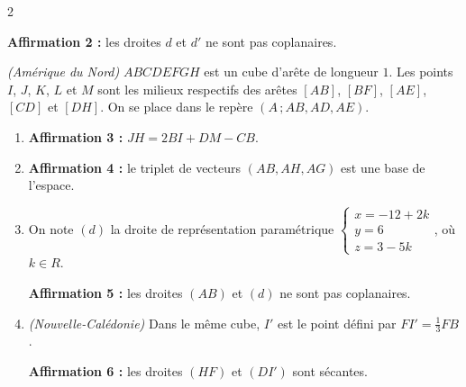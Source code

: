 \documentclass[a4paper,10pt]{article}
\newcommand{\R}{\mathbb{R}}
\newcommand{\N}{\mathbb{N}}
\newcommand{\Z}{\mathbb{Z}}
\newcommand{\Q}{\mathbb{Q}}
\newcommand{\vect}[1]{\overrightarrow{#1}}
\newcommand{\fois}[1]{\times{\color{coulExo}#1}}
\providecommand{\Cf}{\mathcal{C}\sb{f}}%
\providecommand{\Cg}{\mathcal{C}\sb{g}}%
\def\R{R}\def\N{N}\def\Z{Z}\def\Q{Q}\def\vect#1{#1}\def\Cf{Cf}\def\Cg{Cg}\def\fois#1{×#1}%
\newcommand{\paveespace}[3]{%
  \coordinate (A) at (0,0); \coordinate (B) at (#1,0);
  \coordinate (D) at ({0.45*#2},{0.35*#2}); \coordinate (C) at ({#1+0.45*#2},{0.35*#2});
  \coordinate (E) at (0,#3); \coordinate (F) at (#1,#3);
  \coordinate (H) at ({0.45*#2},{#3+0.35*#2}); \coordinate (G) at ({#1+0.45*#2},{#3+0.35*#2});
  \draw (A)--(B)--(F)--(E)--cycle (B)--(C)--(G)--(F) (E)--(H)--(G);
  \draw[dashed] (A)--(D)--(C) (D)--(H);
  \path[font=\footnotesize] (A) node[below left]{$A$} (B) node[below right]{$B$}
    (C) node[right]{$C$} (D) node[above left]{$D$} (E) node[left]{$E$}
    (F) node[below right]{$F$} (G) node[above right]{$G$} (H) node[above left]{$H$};}
\newcommand{\cubeespace}[1]{\paveespace{#1}{#1}{#1}}
\begin{document}
\begin{multicols}{2}
\begin{enumerate}
        \textbf{Affirmation 2 :} les droites $d$ et $d'$ ne sont pas coplanaires.
\end{enumerate}
\begin{minipage}[t]{0.55\linewidth}\raggedright
\emph{(Amérique du Nord)} $ABCDEFGH$ est un cube d'arête de longueur $1$. Les points
$I$, $J$, $K$, $L$ et $M$ sont les milieux respectifs des arêtes $[AB]$, $[BF]$, $[AE]$,
$[CD]$ et $[DH]$. On se place dans le repère $(A\,;\vect{AB},\vect{AD},\vect{AE})$.
\end{minipage}\hfill
\begin{minipage}[t]{0.42\linewidth}\centering\vspace{-4pt}
\end{minipage}
\begin{enumerate}[resume]
  \item \textbf{Affirmation 3 :} $\vect{JH}=2\vect{BI}+\vect{DM}-\vect{CB}$.
  \item \textbf{Affirmation 4 :} le triplet de vecteurs $(\vect{AB},\vect{AH},\vect{AG})$
        est une base de l'espace.
  \item On note $(d)$ la droite de représentation paramétrique
        $\left\{\begin{array}{l} x=-12+2k\\ y=6\\ z=3-5k\end{array}\right.$, où
        $k\in\R$.

        \textbf{Affirmation 5 :} les droites $(AB)$ et $(d)$ ne sont pas coplanaires.
  \item \emph{(Nouvelle-Calédonie)} Dans le même cube, $I'$ est le point défini par
        $\vect{FI'}=\frac{1}{3}\vect{FB}$.

        \textbf{Affirmation 6 :} les droites $(HF)$ et $(DI')$ sont sécantes.
\end{enumerate}


\end{multicols}
\end{document}
